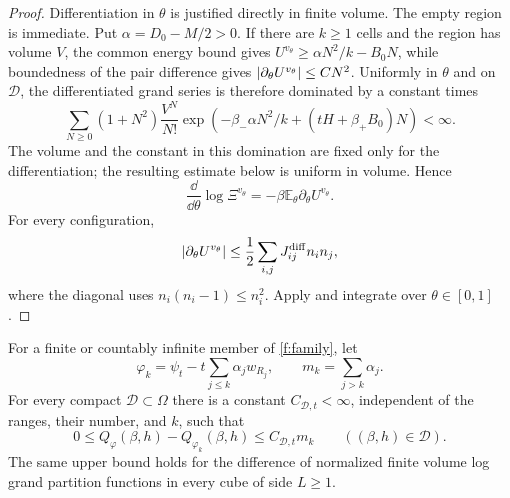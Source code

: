 \begin{proof}
Differentiation in $\theta$ is justified directly in finite volume.
The empty region is immediate.  Put $\alpha=D_0-M/2>0$.
If there are $k\ge1$ cells and the region has volume $V$, the common
energy bound gives
$U^{v_\theta}\ge\alpha N^2/k-B_0N$, while boundedness of the pair
difference gives $\left|\partial_\theta U^{v_\theta}\right|\le C N^2$.
Uniformly in $\theta$ and on $\mathcal D$, the differentiated grand
series is therefore dominated by a constant times
\begin{equation}\label{f:derivative-domination}
 \sum_{N\ge0}(1+N^2)\frac{V^N}{N!}
       \exp\left(-\beta_-\alpha N^2/k
                      +(tH+\beta_+B_0)N\right)<\infty.
\end{equation}
The volume and the constant in this domination are fixed only for
the differentiation; the resulting estimate below is uniform in
volume.  Hence
\[
 \frac{\dd}{\dd\theta}\log\Xi^{v_\theta}
       =-\beta\mathbb E_\theta\partial_\theta U^{v_\theta}.
\]
For every configuration,
\[
 \left|\partial_\theta U^{v_\theta}\right|
 \le\frac12\sum_{i,j}J^{\mathrm{diff}}_{ij}n_i n_j,
\]
where the diagonal uses $n_i(n_i-1)\le n_i^2$.
Apply  and integrate over $\theta\in[0,1]$.
\end{proof}

\begin{corollary}
\label{f:tail-pressure}
For a finite or countably infinite member of \eqref{f:family}, let
\[
 \varphi_k=\psi_t-t\sum_{j\le k}\alpha_jw_{R_j},
 \qquad m_k=\sum_{j>k}\alpha_j.
\]
For every compact $\mathcal D\subset\Omega$ there is a constant
$C_{\mathcal D,t}<\infty$, independent of the ranges, their number,
and $k$, such that
\begin{equation}\label{f:tail-pressure-bound}
 0\le Q_\varphi(\beta,h)-Q_{\varphi_k}(\beta,h)
 \le C_{\mathcal D,t}m_k
 \qquad ((\beta,h)\in\mathcal D).
\end{equation}
The same upper bound holds for the difference of normalized finite
volume log grand partition functions in every cube of side $L\ge1$.
\end{corollary}

